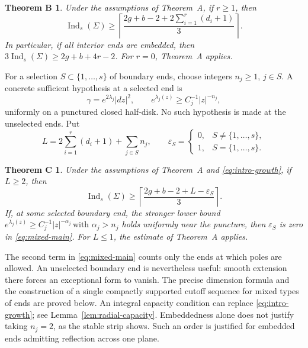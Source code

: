\documentclass[11pt]{amsart}
\numberwithin{equation}{section}
\newtheorem*{theoremB}{Theorem B}
\newtheorem*{theoremC}{Theorem C}
\theoremstyle{definition}
\theoremstyle{remark}
\DeclareMathOperator{\Ind}{Ind}
\begin{document}
\begin{theoremB}
Under the assumptions of Theorem~A, if $r\ge1$, then
\begin{equation}\label{eq:interior-main}
\Ind_s(\Sigma)\ge
\left\lceil\frac{2g+b-2+2\sum_{i=1}^r(d_i+1)}{3}\right\rceil.
\end{equation}
In particular, if all interior ends are embedded, then
$3\Ind_s(\Sigma)\ge 2g+b+4r-2$.
For $r=0$, Theorem~A applies.
\end{theoremB}

For a selection $S\subset\{1,\ldots,s\}$ of boundary ends, choose integers $n_j\ge1$, $j\in S$. A concrete sufficient hypothesis at a selected end is
\begin{equation}\label{eq:intro-growth}
\gamma=e^{2\lambda_j}|dz|^2,\qquad
 e^{\lambda_j(z)}\ge C_j^{-1}|z|^{-n_j},
\end{equation}
uniformly on a punctured closed half-disk. No such hypothesis is made at the unselected ends. Put
\[
L=2\sum_{i=1}^r(d_i+1)+\sum_{j\in S}n_j,
\qquad
\varepsilon_S=
\begin{cases}
0,&S\ne\{1,\ldots,s\},\\
1,&S=\{1,\ldots,s\}.
\end{cases}
\]


\begin{theoremC}
Under the assumptions of Theorem~A and \eqref{eq:intro-growth},
if $L\ge2$, then
\begin{equation}\label{eq:mixed-main}
\Ind_s(\Sigma)\ge
\left\lceil\frac{2g+b-2+L-\varepsilon_S}{3}\right\rceil.
\end{equation}
If, at some selected boundary end, the stronger lower bound
\(
e^{\lambda_j(z)}\ge C_j^{-1}|z|^{-\alpha_j}
\, \text{with }\alpha_j>n_j
\)
holds uniformly near the puncture, then $\varepsilon_S$ is zero in \eqref{eq:mixed-main}.
For $L\le1$, the estimate of Theorem~A applies.
\end{theoremC}

The second term in \eqref{eq:mixed-main} counts only the ends at which poles are allowed. An unselected boundary end is nevertheless useful: smooth extension there forces an exceptional form to vanish. The precise dimension formula and the construction of a single compactly supported cutoff sequence for mixed types of ends are proved below. An integral capacity condition can replace \eqref{eq:intro-growth}; see Lemma~\ref{lem:radial-capacity}. Embeddedness alone does not justify taking $n_j=2$, as the stable strip shows. Such an order is justified for embedded ends admitting reflection across one plane.
\end{document}
